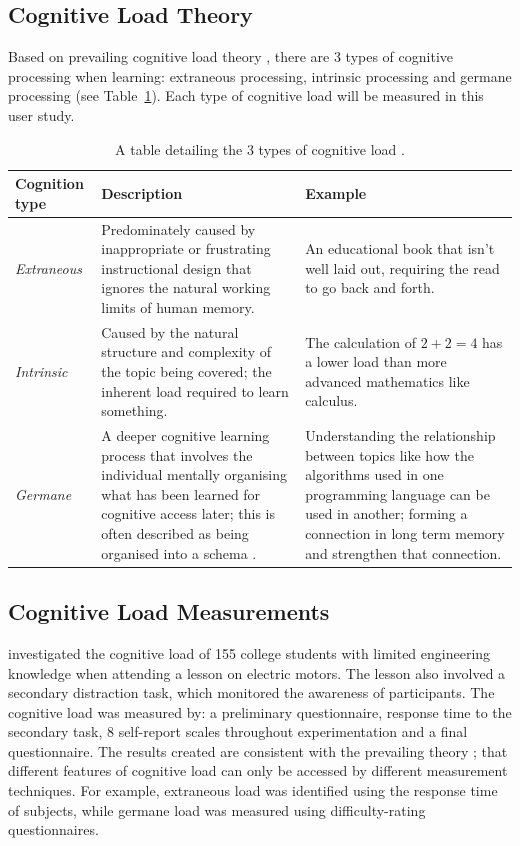 \documentclass[conference]{IEEEtran}
\newcommand\Tstrut{\rule{0pt}{2.6ex}}         %
\begin{document}
\subsection{Cognitive Load Theory}
Based on prevailing cognitive load theory \cite{deleeuw2008comparison,de2010cognitive,sweller1994cognitive}, there are 3 types of cognitive processing when learning: extraneous processing, intrinsic processing and germane processing (see Table~\ref{Tabel:1}). Each type of cognitive load will be measured in this user study. 
\begin{table}[h!]
    \caption{A table detailing the 3 types of cognitive load \cite{deleeuw2008comparison,de2010cognitive}.}
    \label{Tabel:1}
    \centering
    \begin{tabular}{| p{8em} | p{8cm}| p{6cm} |}
     \hline\Tstrut
     \textbf{Cognition type} & \textbf{Description} & \textbf{Example} \\ [0.5ex] 
      \hline\hline\Tstrut
       \textit{Extraneous} & Predominately caused by inappropriate or frustrating instructional design that ignores the natural working limits of human memory. & An educational book that isn't well laid out, requiring the read to go back and forth. \\
         \hline\Tstrut
        \textit{Intrinsic} & Caused by the natural structure and complexity of the topic being covered; the inherent load required to learn something. & The calculation of  $2+2=4$ has a lower load than more advanced mathematics like calculus.\\
         \hline\Tstrut
       \textit{Germane} & A deeper cognitive learning process that involves the individual mentally organising what has been learned for cognitive access later; this is often described as being organised into a schema \cite{paas2003cognitive}.& Understanding the relationship between topics like how the algorithms used in one programming language can be used in another; forming a connection in long term memory and strengthen that connection.\\
         \hline
    \end{tabular}
\end{table}

\subsection{Cognitive Load Measurements}
\citet{deleeuw2008comparison} investigated the cognitive load of 155 college students with limited engineering knowledge when attending a lesson on electric motors. The lesson also involved a secondary distraction task, which monitored the awareness of participants. The cognitive load was measured by: a preliminary questionnaire, response time to the secondary task, 8 self-report scales throughout experimentation and a final questionnaire. The results created are consistent with the prevailing theory \cite{ayres2006using}; that different features of cognitive load can only be accessed by different measurement techniques. For example, extraneous load was identified using the response time of subjects, while germane load was measured using difficulty-rating questionnaires. 
\end{document}
